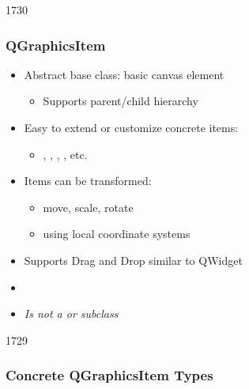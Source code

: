 
\begin{slide}{1730}
\frametitle{QGraphicsItem}
\begin{itemize}

\item Abstract base class: basic canvas element
    \begin{itemize}
    \item Supports parent/child hierarchy
    \end{itemize}
    
\item Easy to extend or customize concrete items:
    \begin{itemize}
    \item {}, , , , etc.
    \end{itemize}

\item Items can be transformed:
    \begin{itemize}
    \item move, scale, rotate
    \item using local coordinate systems
    \end{itemize}
    
\item Supports Drag and Drop similar to QWidget
\item []
\item \textit{Is not a  or  subclass}
\end{itemize}
\end{slide}


\begin{slide}{1729}
\frametitle{Concrete QGraphicsItem Types}
\end{slide}


